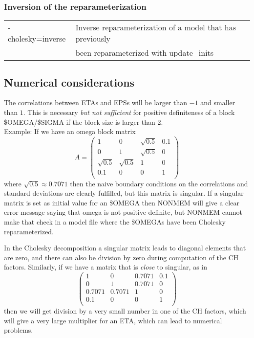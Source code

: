 \subsubsection*{Inversion of the reparameterization}
\begin{tabular}{ll}
    -cholesky=inverse &             Inverse reparameterization of a model that has previously\\
     &  been reparameterized with update\_inits\\
\end{tabular}

\subsection{Numerical considerations}
The correlations between ETAs and EPSs will be larger than $-1$ and smaller than $1$. This is necessary \emph{but not sufficient}
for positive definiteness of a block \$OMEGA/\$SIGMA if the block size is larger than 2.\\
Example: If we have an omega block matrix
\[
A=
\left(
\begin{array}{cccc}
1          & 0          & \sqrt{0.5} & 0.1\\
0          & 1          & \sqrt{0.5} & 0\\
\sqrt{0.5} & \sqrt{0.5} & 1          & 0\\
0.1        & 0          & 0          & 1\\
\end{array}
\right)
\]
where $\sqrt{0.5}\approx 0.7071$
then the naive boundary conditions on the correlations and standard deviations are clearly fulfilled, but this matrix is singular.
If a singular matrix is set as initial value for an \$OMEGA then NONMEM will give a clear error message saying that omega is not positive definite, but NONMEM cannot make that check in a model file where the \$OMEGAs have been Cholesky reparameterized.

In the Cholesky decomposition a singular matrix leads to diagonal elements that are zero, and there can also be division by zero during computation of the CH factors. Similarly, if we have a matrix that is \emph{close} to singular, as in
\[
\left(
\begin{array}{cccc}
1          & 0          & 0.7071     & 0.1\\
0          & 1          & 0.7071     & 0\\
0.7071     & 0.7071     & 1          & 0\\
0.1        & 0          & 0          & 1\\
\end{array}
\right)
\]
then we will get division by a very small number in one of the CH factors, which will give a very large multiplier for an ETA, which can lead to numerical problems.

